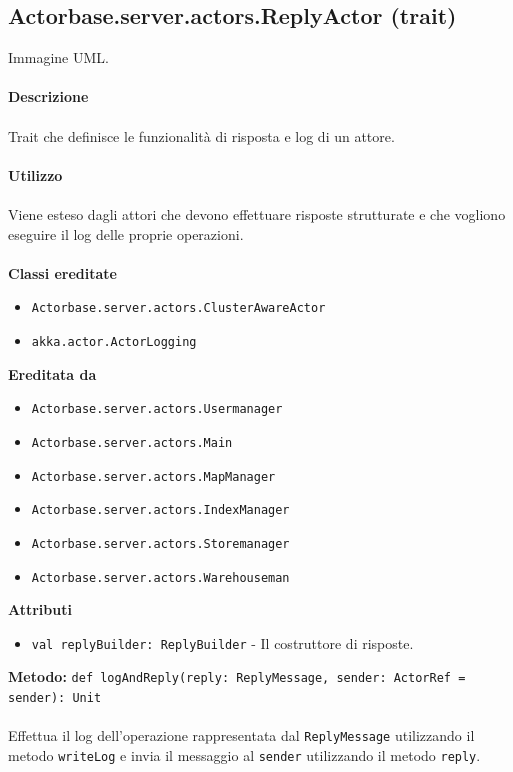 \documentclass[a4paper]{article}
\begin{document}
	\subsection{Actorbase.server.actors.ReplyActor (trait)}
		Immagine UML.
		\\ \\
		\textbf{Descrizione}
			\\ \\
			Trait che definisce le funzionalità di risposta e log di un attore.
			\\ \\
		\textbf{Utilizzo}
			\\ \\
			Viene esteso dagli attori che devono effettuare risposte strutturate e che vogliono eseguire il log delle proprie operazioni.
			\\ \\
		\textbf{Classi ereditate}
			\begin{itemize}
				\item \texttt{Actorbase.server.actors.ClusterAwareActor}
				\item \texttt{akka.actor.ActorLogging}
			\end{itemize}
		\textbf{Ereditata da}
			\begin{itemize}
				\item \texttt{Actorbase.server.actors.Usermanager}
				\item \texttt{Actorbase.server.actors.Main}
				\item \texttt{Actorbase.server.actors.MapManager}
				\item \texttt{Actorbase.server.actors.IndexManager}
				\item \texttt{Actorbase.server.actors.Storemanager}
				\item \texttt{Actorbase.server.actors.Warehouseman}
			\end{itemize}
		\textbf{Attributi}
			\begin{itemize}
				\item \texttt{val replyBuilder: ReplyBuilder} - Il costruttore di risposte. 
			\end{itemize}
		\textbf{Metodo: }\texttt{def logAndReply(reply: ReplyMessage, sender: ActorRef = sender): Unit}
			\\ \\
			Effettua il log dell'operazione rappresentata dal \texttt{ReplyMessage} utilizzando il metodo \texttt{writeLog} e invia il messaggio al \texttt{sender} utilizzando il metodo \texttt{reply}.
			\\ \\
\end{document}
